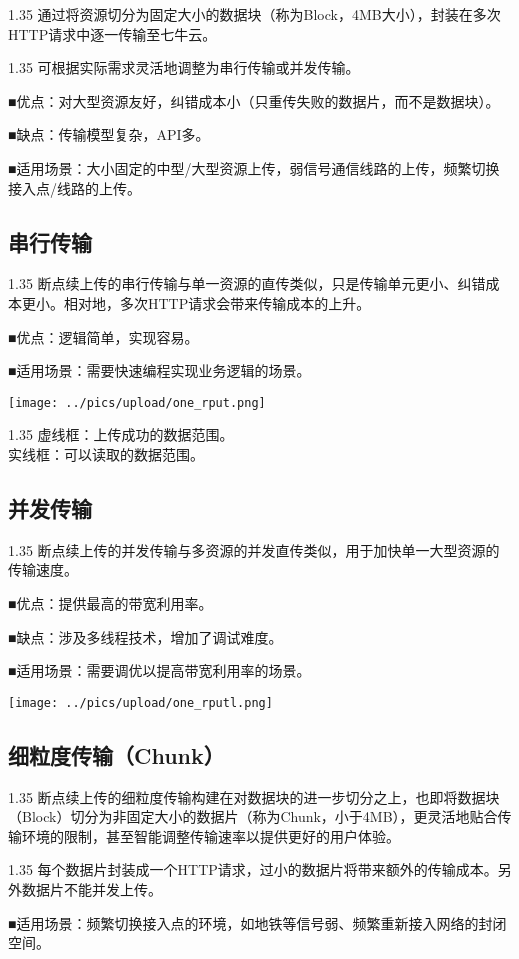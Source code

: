 \documentclass[11pt, oneside]{book}
\newcommand{\qpara}[1]{
\vspace{0.2em}
\begin{spacing}{1.35}
\noindent
#1\par
\end{spacing}
\vspace{0.2em}
}
\newcommand{\qblock}[1]{
\vspace{0.1em}
\noindent
#1\par
\vspace{0.1em}
}
\begin{document}
\qpara{通过将资源切分为固定大小的数据块（称为Block，4MB大小），封装在多次HTTP请求中逐一传输至七牛云。}
\qpara{可根据实际需求灵活地调整为串行传输或并发传输。}
\qblock{■\thinspace 优点：对大型资源友好，纠错成本小（只重传失败的数据片，而不是数据块）。}
\qblock{■\thinspace 缺点：传输模型复杂，API多。}
\qblock{■\thinspace 适用场景：大小固定的中型/大型资源上传，弱信号通信线路的上传，频繁切换接入点/线路的上传。}

\subsection{串行传输}

\qpara{断点续上传的串行传输与单一资源的直传类似，只是传输单元更小、纠错成本更小。相对地，多次HTTP请求会带来传输成本的上升。}
\qblock{■\thinspace 优点：逻辑简单，实现容易。}
\qblock{■\thinspace 适用场景：需要快速编程实现业务逻辑的场景。}

\begin{center}
\texttt{[image: ../pics/upload/one\_rput.png]}
\end{center}

\qpara{虚线框：上传成功的数据范围。 \\ 实线框：可以读取的数据范围。}

\subsection{并发传输}

\qpara{断点续上传的并发传输与多资源的并发直传类似，用于加快单一大型资源的传输速度。}
\qblock{■\thinspace 优点：提供最高的带宽利用率。}
\qblock{■\thinspace 缺点：涉及多线程技术，增加了调试难度。}
\qblock{■\thinspace 适用场景：需要调优以提高带宽利用率的场景。}

\begin{center}
\texttt{[image: ../pics/upload/one\_rputl.png]}
\end{center}

\subsection{细粒度传输（Chunk）}

\qpara{断点续上传的细粒度传输构建在对数据块的进一步切分之上，也即将数据块（Block）切分为非固定大小的数据片（称为Chunk，小于4MB），更灵活地贴合传输环境的限制，甚至智能调整传输速率以提供更好的用户体验。}
\qpara{每个数据片封装成一个HTTP请求，过小的数据片将带来额外的传输成本。另外数据片不能并发上传。}
\qblock{■\thinspace 适用场景：频繁切换接入点的环境，如地铁等信号弱、频繁重新接入网络的封闭空间。}
\end{document}
